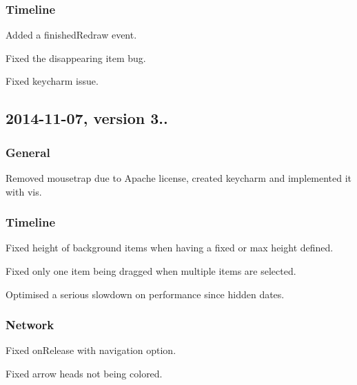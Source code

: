 \subsubsection*{Timeline}


\begin{DoxyItemize}
\item Added a finished\+Redraw event.
\item Fixed the disappearing item bug.
\item Fixed keycharm issue.
\end{DoxyItemize}

\subsection*{2014-\/11-\/07, version 3..}

\subsubsection*{General}


\begin{DoxyItemize}
\item Removed mousetrap due to Apache license, created keycharm and implemented it with vis.
\end{DoxyItemize}

\subsubsection*{Timeline}


\begin{DoxyItemize}
\item Fixed height of background items when having a fixed or max height defined.
\item Fixed only one item being dragged when multiple items are selected.
\item Optimised a serious slowdown on performance since hidden dates.
\end{DoxyItemize}

\subsubsection*{Network}


\begin{DoxyItemize}
\item Fixed on\+Release with navigation option.
\item Fixed arrow heads not being colored.
\end{DoxyItemize}

